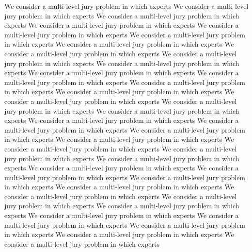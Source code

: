 \documentclass[letterpaper]{article} %
\begin{document}
\vskip 0.2in
We consider a multi-level jury problem in which experts
We consider a multi-level jury problem in which experts
We consider a multi-level jury problem in which experts
We consider a multi-level jury problem in which experts
We consider a multi-level jury problem in which experts
We consider a multi-level jury problem in which experts
We consider a multi-level jury problem in which experts
We consider a multi-level jury problem in which experts
We consider a multi-level jury problem in which experts
We consider a multi-level jury problem in which experts
We consider a multi-level jury problem in which experts
We consider a multi-level jury problem in which experts
We consider a multi-level jury problem in which experts
We consider a multi-level jury problem in which experts
We consider a multi-level jury problem in which experts
We consider a multi-level jury problem in which experts
We consider a multi-level jury problem in which experts
We consider a multi-level jury problem in which experts
We consider a multi-level jury problem in which experts
We consider a multi-level jury problem in which experts
We consider a multi-level jury problem in which experts
We consider a multi-level jury problem in which experts
We consider a multi-level jury problem in which experts
We consider a multi-level jury problem in which experts
We consider a multi-level jury problem in which experts
We consider a multi-level jury problem in which experts
We consider a multi-level jury problem in which experts
We consider a multi-level jury problem in which experts
We consider a multi-level jury problem in which experts
We consider a multi-level jury problem in which experts
We consider a multi-level jury problem in which experts
We consider a multi-level jury problem in which experts
We consider a multi-level jury problem in which experts
We consider a multi-level jury problem in which experts
We consider a multi-level jury problem in which experts
We consider a multi-level jury problem in which experts
\clearpage


\end{document}
